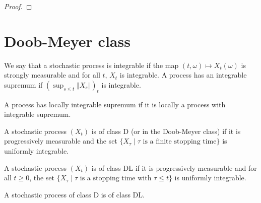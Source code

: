 \begin{proof}

\end{proof}



\section{Doob-Meyer class}

\begin{definition}\label{def:HasIntegrableSup}
  \leanok
We say that a stochastic process is integrable if the map $(t,\omega) \mapsto X_t(\omega)$ is strongly measurable and for all $t$, $X_t$ is integrable.
A process has an integrable supremum if $(\sup_{s \le t} \Vert X_s \Vert)_t$ is integrable.
\end{definition}


\begin{definition}\label{def:locallyIntegrableSup}
  \leanok
A process has locally integrable supremum if it is locally a process with integrable supremum.
\end{definition}


\begin{definition}\label{def:classD}
  \leanok
A stochastic process $(X_t)$ is of class D (or in the Doob-Meyer class) if it is progressively measurable and the set $\{X_\tau \mid \tau \text{ is a finite stopping time}\}$ is uniformly integrable.
\end{definition}


\begin{definition}[Class DL]\label{def:classDL}
  \leanok
A stochastic process $(X_t)$ is of class DL if it is progressively measurable and for all $t \ge 0$, the set $\{X_\tau \mid \tau \text{ is a stopping time with } \tau \le t\}$ is uniformly integrable.
\end{definition}


\begin{lemma}\label{lem:classDLOfClassD}
  \leanok
A stochastic process of class D is of class DL.
\end{lemma}

